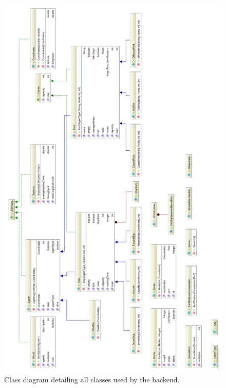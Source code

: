 \newpage
\begin{figure}[h!]
	\centering
	\includegraphics[height=0.93\textheight]{images/class_diagram}
	\caption{Class diagram detailing all classes used by the backend.}
	\label{fig:class_diagram}
\end{figure}




